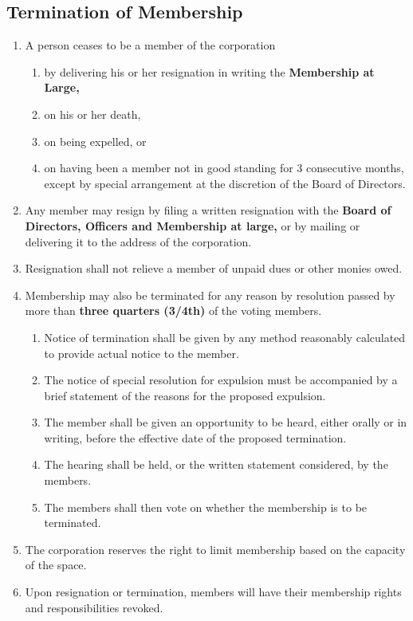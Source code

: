 \documentclass{article}
\begin{document}
\subsection{Termination of Membership}
\begin{enumerate}
    \item A person ceases to be a member of the corporation
    \begin{enumerate}
    \item by delivering his or her resignation in writing the \textbf{Membership at Large,}
    \item on his or her death,
    \item on being expelled, or
    \item on having been a member not in good standing for 3 consecutive months,
    except by special arrangement at the discretion of the Board of Directors.
    \end{enumerate}
    \item Any member may resign by filing a written resignation with the
    \textbf{Board of Directors, Officers and Membership at large,} or by mailing
    or delivering it to the address of the corporation.
    \item Resignation shall not relieve a member of unpaid dues or other monies owed.
    \item Membership may also be terminated for any reason by resolution passed
    by more than \textbf{three quarters (3/4th)} of the voting members.
    \begin{enumerate}
        \item Notice of termination shall be given by any method reasonably
        calculated to provide actual notice to the member.
        \item The notice of special resolution for expulsion must be accompanied
        by a brief statement of the reasons for the proposed expulsion.
        \item The member shall be given an opportunity to be heard, either
        orally or in writing, before the effective date of the proposed termination.
        \item The hearing shall be held, or the written statement considered, by
        the members.
        \item The members shall then vote on whether the membership is to be
        terminated.
    \end{enumerate}
    \item The corporation reserves the right to limit membership based on the
    capacity of the space.
    \item Upon resignation or termination, members will have their membership
    rights and responsibilities revoked.
\end{enumerate}
\end{document}
